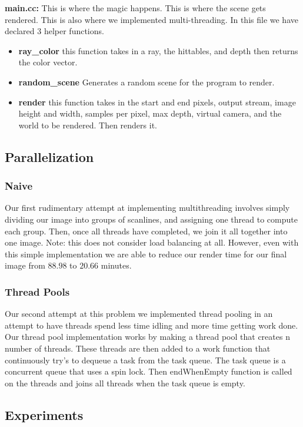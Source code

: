 \documentclass[conference]{IEEEtran}
\begin{document}
\textbf{main.cc:} This is where the magic happens. This is where the scene gets rendered. This is also where we implemented multi-threading. In this file we have declared 3 helper functions. 
\begin{itemize}
    \item \textbf{ray\_color} this function takes in a ray, the hittables, and depth then returns the color vector.
    \item \textbf{random\_scene} Generates a random scene for the program to render.
    \item \textbf{render} this function takes in the start and end pixels, output stream, image height and width, samples per pixel, max depth, virtual camera, and the world to be rendered. Then renders it.
\end{itemize}

\subsection{Parallelization}

\subsubsection{Naive}
Our first rudimentary attempt at implementing multithreading involves simply dividing our image into groups of scanlines, and assigning one thread to compute each group. Then, once all threads have completed, we join it all together into one image. Note: this does not consider load balancing at all. However, even with this simple implementation we are able to reduce our render time for our final image from $88.98$ to $20.66$ minutes.

\subsubsection{Thread Pools}
Our second attempt at this problem we implemented thread pooling in an attempt to have threads spend less time idling and more time getting work done. Our thread pool implementation works by making a thread pool that creates n number of threads. These threads are then added to a work function that continuously try's to dequeue a task from the task queue. The task queue is a concurrent queue that uses a spin lock. Then endWhenEmpty function is called on the threads and joins all threads when the task queue is empty.

\subsection{Experiments}
\end{document}
